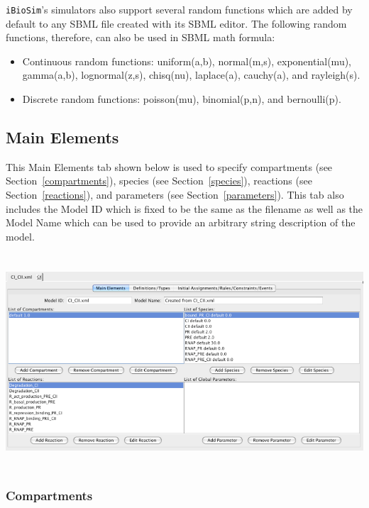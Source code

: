 \documentclass[titlepage,11pt]{article}
\begin{document}
{\tt iBioSim}'s simulators also support several random functions which
are added by default to any SBML file created with its SBML editor.  
The following random functions, therefore, can also be used in SBML
math formula:
\begin{itemize}
\item Continuous random functions: uniform(a,b), normal(m,s), exponential(mu), 
  gamma(a,b), lognormal(z,s), chisq(nu), laplace(a), cauchy(a), and 
  rayleigh(s).
\item Discrete random functions: poisson(mu), binomial(p,n), and bernoulli(p).
\end{itemize}

\clearpage

\subsection{\label{MainElem}Main Elements}

\noindent
This Main Elements tab shown below is used to specify 
compartments (see Section~\ref{compartments}), 
species (see Section~\ref{species}), 
reactions (see Section~\ref{reactions}), and
parameters (see Section~\ref{parameters}).
This tab also includes the Model ID which is fixed to be the same as
the filename as well as the Model Name which can be used to provide an
arbitrary string description of the model.
\begin{center}
\includegraphics[height=80mm]{screenshots/mainElem}
\end{center}

\clearpage

\subsubsection{\label{compartments}Compartments}
\end{document}
